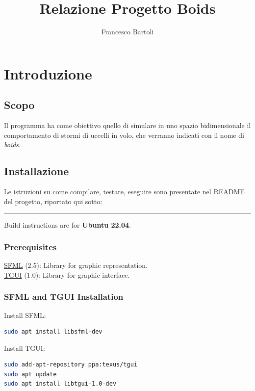 \documentclass[10pt,a4paper]{article}
\title{Relazione Progetto Boids}
\author{Francesco Bartoli}
\date{}
\begin{document}
\maketitle

\hypertarget{toc}{}
\tableofcontents

\setlength{\parindent}{0pt}


\section{Introduzione}
\subsection{Scopo}
Il programma ha come obiettivo quello di simulare in uno spazio bidimensionale il comportamento di stormi di uccelli in volo, che verranno indicati con il nome di \textit{boids}. 

\subsection{Installazione}

Le istruzioni su come compilare, testare, eseguire sono presentate nel README del progetto, riportato qui sotto:

\par\noindent\rule{\textwidth}{0.4pt}

Build instructions are for \textbf{Ubuntu 22.04}.

\subsubsection{Prerequisites}

\href{https://github.com/SFML/SFML}{SFML} (2.5): Library for graphic representation. \\
\href{https://github.com/texus/TGUI}{TGUI} (1.0): Library for graphic interface.

\subsubsection{SFML and TGUI Installation}

Install SFML:

\begin{lstlisting}[style=codecolour, language=bash]
sudo apt install libsfml-dev
\end{lstlisting}

Install TGUI:

\begin{lstlisting}[style=codecolour, language=bash]
sudo add-apt-repository ppa:texus/tgui
sudo apt update
sudo apt install libtgui-1.0-dev
\end{lstlisting}
\end{document}

